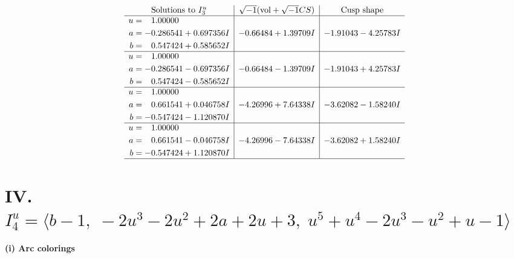 \documentclass[1p]{elsarticle_modified}
\theoremstyle{definition}
\newcommand{\I}{\sqrt{-1}}
\begin{document}
$$\begin{array}{c|c|c}  
\text{Solutions to }I^u_{3}& \I (\text{vol} + \sqrt{-1}CS) & \text{Cusp shape}\\
 \hline 
\begin{aligned}
u &= \phantom{-}1.00000\phantom{ +0.000000I} \\
a &= -0.286541 + 0.697356 I \\
b &= \phantom{-}0.547424 + 0.585652 I\end{aligned}
 & -0.66484 + 1.39709 I & -1.91043 - 4.25783 I \\ \hline\begin{aligned}
u &= \phantom{-}1.00000\phantom{ +0.000000I} \\
a &= -0.286541 - 0.697356 I \\
b &= \phantom{-}0.547424 - 0.585652 I\end{aligned}
 & -0.66484 - 1.39709 I & -1.91043 + 4.25783 I \\ \hline\begin{aligned}
u &= \phantom{-}1.00000\phantom{ +0.000000I} \\
a &= \phantom{-}0.661541 + 0.046758 I \\
b &= -0.547424 - 1.120870 I\end{aligned}
 & -4.26996 + 7.64338 I & -3.62082 - 1.58240 I \\ \hline\begin{aligned}
u &= \phantom{-}1.00000\phantom{ +0.000000I} \\
a &= \phantom{-}0.661541 - 0.046758 I \\
b &= -0.547424 + 1.120870 I\end{aligned}
 & -4.26996 - 7.64338 I & -3.62082 + 1.58240 I\\
 \hline 
 \end{array}$$\newpage\newpage\renewcommand{\arraystretch}{1}
\centering \section*{IV. $I^u_{4}= \langle b-1,\;-2 u^3-2 u^2+2 a+2 u+3,\;u^5+u^4-2 u^3- u^2+u-1 \rangle$}
\flushleft \textbf{(i) Arc colorings}\\
\end{document}
